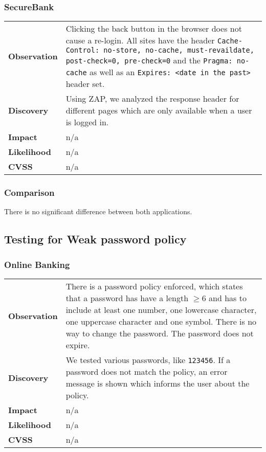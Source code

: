 \subsubsection*{SecureBank}

\begin{tabular}{l|p{10cm}}

\textbf{Observation} & Clicking the back button in the browser does not cause a re-login. All sites have the header \texttt{Cache-Control: no-store, no-cache, must-revaildate, post-check=0, pre-check=0} and the \texttt{Pragma: no-cache} as well as an \texttt{Expires: <date in the past>} header set. \\
\textbf{Discovery} & Using ZAP, we analyzed the response header for different pages which are only available when a user is logged in.\\
\textbf{Impact} & n/a \\
\textbf{Likelihood} & n/a \\
\textbf{CVSS} & n/a \\
\end{tabular}

\subsubsection*{Comparison}
There is no significant difference between both applications.

\clearpage


\subsection{Testing for Weak password policy}

\subsubsection*{Online Banking}

\begin{tabular}{l|p{10cm}}

\textbf{Observation} & There is a password policy enforced, which states that a password has have a length $\geq6$ and has to include at least one number, one lowercase character, one uppercase character and one symbol. There is no way to change the password. The password does not expire. \\
\textbf{Discovery} & We tested various passwords, like \texttt{123456}. If a password does not match the policy, an error message is shown which informs the user about the policy. \\
\textbf{Impact} & n/a \\
\textbf{Likelihood} & n/a \\
\textbf{CVSS} & n/a \\
\end{tabular}

